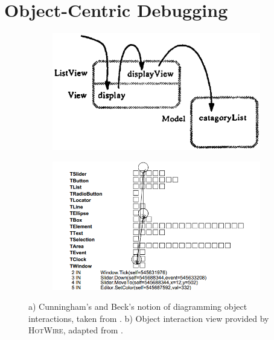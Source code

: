 
\section{Object-Centric Debugging}

\begin{figure}[b]
	\centering
	
	\begin{subfigure}[b]{0.45\textwidth}
		\centering
        \includegraphics[width=\textwidth]{../images/06-Cunningham-Diagram}
        \caption[Object Interaction Diagrams by Cunningham and Beck]{}
		\label{fig:DebugCunningham}
	\end{subfigure}
	\quad
	\begin{subfigure}[b]{0.45\textwidth}
		\centering
		\includegraphics[width=\textwidth]{../images/06-Laffra-HotWire}
		\caption[Object Interaction View provided by \textsc{HotWire}]{}
		\label{fig:DebugLaffra}
	\end{subfigure}
	
	\caption[TOC Caption]{
		a) Cunningham's and Beck's notion of diagramming object interactions, taken from \cite{cunningham_diagram_1986}.
		b) Object interaction view provided by \textsc{HotWire}, adapted from \cite{laffra_hotwire:_1994}.
	}
	\label{fig:VisualDebuggers}
\end{figure}

